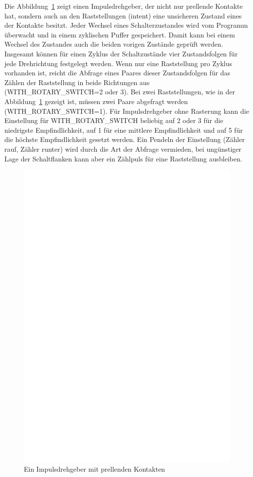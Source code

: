 Die Abbildung~\ref{fig:RotBounce} zeigt einen Impulsdrehgeber, der nicht nur
prellende Kontakte hat, sondern auch an den Raststellungen (intent) eine unsicheren Zustand
eines der Kontakte besitzt. Jeder Wechsel eines Schalterzustandes wird vom Programm 
überwacht und in einem zyklischen Puffer gespeichert. Damit kann bei einem Wechsel des
Zustandes auch die beiden vorigen Zustände geprüft werden.
Insgesamt können für einen Zyklus der Schaltzustände vier Zustandsfolgen für jede Drehrichtung
festgelegt werden. Wenn nur eine Raststellung pro Zyklus vorhanden ist, reicht die Abfrage eines
Paares dieser Zustandsfolgen für das Zählen der Raststellung in beide Richtungen aus (WITH\_ROTARY\_SWITCH=2 oder 3).
Bei zwei Raststellungen, wie in der Abbildung~\ref{fig:RotBounce} gezeigt ist,
müssen zwei Paare abgefragt werden (WITH\_ROTARY\_SWITCH=1).
Für Impulsdrehgeber ohne Rasterung kann die Einstellung für WITH\_ROTARY\_SWITCH beliebig auf
2 oder 3 für die niedrigste Empfindlichkeit, auf 1 für eine mittlere Empfindlichkeit und auf 5 für
die höchste Empfindlichkeit gesetzt werden. 
Ein Pendeln der Einstellung (Zähler rauf, Zähler runter) wird durch die Art der Abfrage vermieden, bei
ungünstiger Lage der Schaltflanken kann aber ein Zählpuls für eine Raststellung ausbleiben.

\begin{figure}[H]
\centering
\includegraphics[width=14cm]{../FIG/rotary_bouncing.eps}
\caption{Ein Impulsdrehgeber mit prellenden Kontakten}
\label{fig:RotBounce}
\end{figure}

